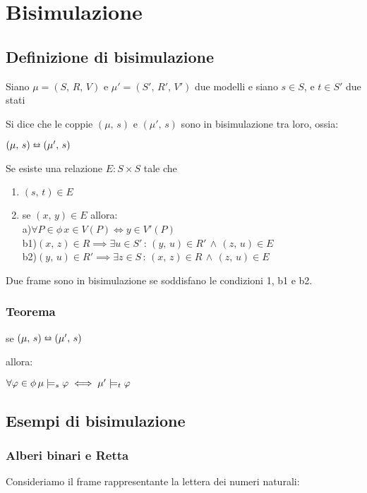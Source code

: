 
\chapter{Bisimulazione}


\section{Definizione di bisimulazione}

Siano $\mu=(S,\, R,\, V)$ e $\mu'=(S',\, R',\, V')$ due modelli
e siano $s\in S$, e $t\in S'$ due stati

Si dice che le coppie $(\mu,\, s)$ e $(\mu',\, s)$ sono in bisimulazione
tra loro, ossia:

$(\mu,\, s)\leftrightarroweq(\mu',\, s)$

Se esiste una relazione $E:S\times S$ tale che
\begin{enumerate}
\item $(s,\, t)\in E$
\item se $(x,\, y)\in E$ allora:\\
a)$\forall P\in\phi\, x\in V(P)\iff y\in V'(P)$\\
b1)$(x,\, z)\in R\implies\exists u\in S'\,:\,(y,\, u)\in R'\,\wedge\,(z,\, u)\in E$\\
b2)$(y,\, u)\in R'\implies\exists z\in S\,:\,(x,\, z)\in R\,\wedge\,(z,\, u)\in E$
\end{enumerate}
Due frame sono in bisimulazione se soddisfano le condizioni 1, b1
e b2.


\subsection{Teorema}

se $(\mu,\, s)\leftrightarroweq(\mu',\, s)$

allora: 

$\forall\varphi\in\phi\,\mu\models_{s}\varphi\iff\mu'\models_{t}\varphi$


\section{Esempi di bisimulazione}


\subsection{Alberi binari e Retta}

Consideriamo il frame rappresentante la lettera dei numeri naturali:

